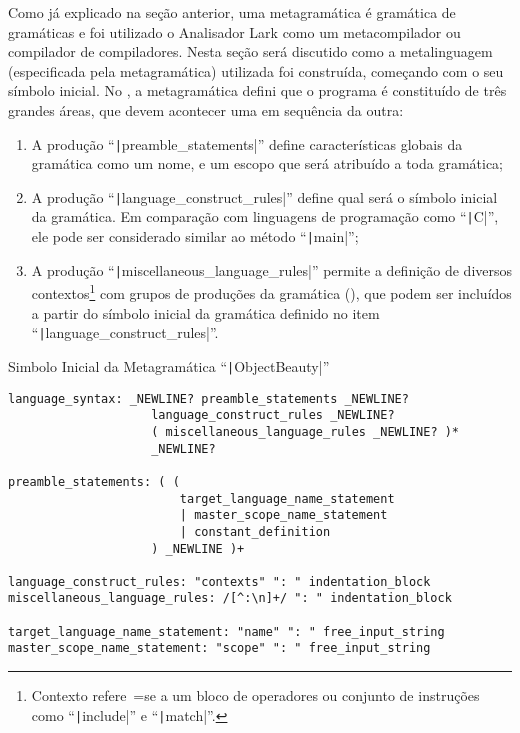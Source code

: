 Como já explicado na seção anterior,
uma metagramática é gramática de gramáticas e
foi utilizado o Analisador Lark como um metacompilador ou
compilador de compiladores.
Nesta seção será discutido como a metalinguagem (especificada pela metagramática) utilizada foi construída,
começando com o seu símbolo inicial.
No ,
a metagramática defini que o programa é constituído de três grandes áreas,
que devem acontecer uma em sequência da outra:
\begin{enumerate}
\item A produção ``\texttt|preamble_statements|'' define características globais da gramática como um nome,
e um escopo que será atribuído a toda gramática;
\item A produção ``\texttt|language_construct_rules|'' define qual será o símbolo inicial da gramática.
Em comparação com linguagens de programação como ``\texttt|C|'',
ele pode ser considerado similar ao método ``\texttt|main|'';
\item A produção ``\texttt|miscellaneous_language_rules|'' permite a definição de diversos contextos\footnote{
Contexto refere~=se a um bloco de operadores ou
conjunto de instruções como ``\texttt|include|'' e
``\texttt|match|''.
} com grupos de produções da gramática (),
que podem ser incluídos a partir do símbolo inicial da gramática definido no item ``\texttt|language_construct_rules|''.
\end{enumerate}%
\begin{code}
\caption{Simbolo Inicial da Metagramática ``\texttt|ObjectBeauty|''}
\label{code:simboloInicialDaMetagramatica}
\begin{verbatim}
language_syntax: _NEWLINE? preamble_statements _NEWLINE?
                    language_construct_rules _NEWLINE?
                    ( miscellaneous_language_rules _NEWLINE? )*
                    _NEWLINE?

preamble_statements: ( (
                        target_language_name_statement
                        | master_scope_name_statement
                        | constant_definition
                    ) _NEWLINE )+

language_construct_rules: "contexts" ": " indentation_block
miscellaneous_language_rules: /[^:\n]+/ ": " indentation_block

target_language_name_statement: "name" ": " free_input_string
master_scope_name_statement: "scope" ": " free_input_string
\end{verbatim}
\end{code}

